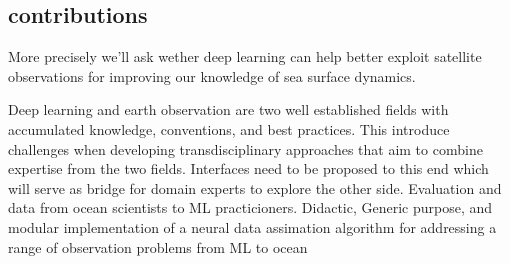 \begin{bibunit}
\subsection{contributions}
More precisely we'll ask wether deep learning can help better exploit satellite observations for improving our knowledge of sea surface dynamics.


Deep learning and earth observation are two well established fields with accumulated knowledge, conventions, and best practices. 
This introduce challenges when developing transdisciplinary approaches that aim to combine expertise from the two fields.
Interfaces need to be proposed to this end which will serve as bridge for domain experts to explore the other side.
Evaluation and data from ocean scientists to ML practicioners. 
Didactic, Generic purpose, and modular implementation of a neural data assimation algorithm for addressing a range of observation problems from ML to ocean



\end{bibunit}

